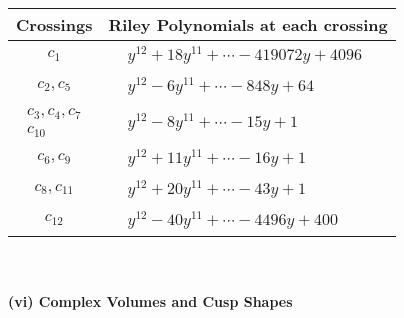 \documentclass[1p]{elsarticle_modified}
\theoremstyle{definition}
\begin{document}
\begin{tabular}{m{50pt}|m{274pt}}
Crossings & \hspace{64pt}Riley Polynomials at each crossing \\
\hline $$\begin{aligned}c_{1}\end{aligned}$$&$\begin{aligned}
&y^{12}+18 y^{11}+\cdots-419072 y+4096
\end{aligned}$\\
\hline $$\begin{aligned}c_{2},c_{5}\end{aligned}$$&$\begin{aligned}
&y^{12}-6 y^{11}+\cdots-848 y+64
\end{aligned}$\\
\hline $$\begin{aligned}c_{3},c_{4},c_{7}\\c_{10}\end{aligned}$$&$\begin{aligned}
&y^{12}-8 y^{11}+\cdots-15 y+1
\end{aligned}$\\
\hline $$\begin{aligned}c_{6},c_{9}\end{aligned}$$&$\begin{aligned}
&y^{12}+11 y^{11}+\cdots-16 y+1
\end{aligned}$\\
\hline $$\begin{aligned}c_{8},c_{11}\end{aligned}$$&$\begin{aligned}
&y^{12}+20 y^{11}+\cdots-43 y+1
\end{aligned}$\\
\hline $$\begin{aligned}c_{12}\end{aligned}$$&$\begin{aligned}
&y^{12}-40 y^{11}+\cdots-4496 y+400
\end{aligned}$\\
\hline
\end{tabular}\\~\\
\newpage\flushleft \textbf{(vi) Complex Volumes and Cusp Shapes}
\end{document}
